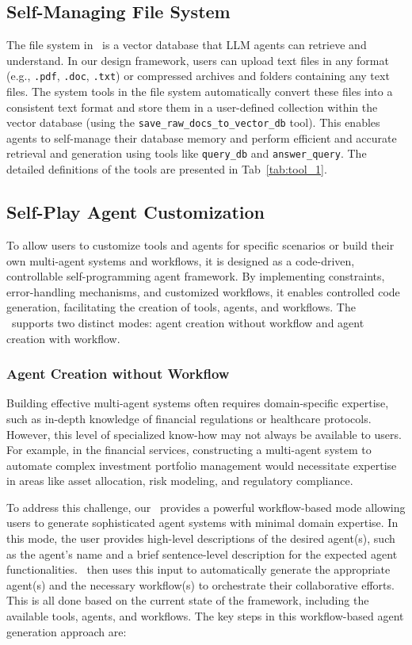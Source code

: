 \subsection{Self-Managing File System}
The file system in \model\ is a vector database that LLM agents can retrieve and understand. In our design framework, users can upload text files in any format (e.g., \texttt{.pdf}, \texttt{.doc}, \texttt{.txt}) or compressed archives and folders containing any text files. The system tools in the file system automatically convert these files into a consistent text format and store them in a user-defined collection within the vector database (using the \texttt{save\_raw\_docs\_to\_vector\_db} tool). This enables agents to self-manage their database memory and perform efficient and accurate retrieval and generation using tools like \texttt{query\_db} and \texttt{answer\_query}. The detailed definitions of the tools are presented in Tab~\ref{tab:tool_1}.

\subsection{Self-Play Agent Customization}
To allow users to customize tools and agents for specific scenarios or build their own multi-agent systems and workflows, it is designed as a code-driven, controllable self-programming agent framework. By implementing constraints, error-handling mechanisms, and customized workflows, it enables controlled code generation, facilitating the creation of tools, agents, and workflows. The \model\ supports two distinct modes: agent creation without workflow and agent creation with workflow.

\subsubsection{Agent Creation without Workflow}
Building effective multi-agent systems often requires domain-specific expertise, such as in-depth knowledge of financial regulations or healthcare protocols. However, this level of specialized know-how may not always be available to users. For example, in the financial services, constructing a multi-agent system to automate complex investment portfolio management would necessitate expertise in areas like asset allocation, risk modeling, and regulatory compliance.

To address this challenge, our \model\ provides a powerful workflow-based mode allowing users to generate sophisticated agent systems with minimal domain expertise. In this mode, the user provides high-level descriptions of the desired agent(s), such as the agent's name and a brief sentence-level description for the expected agent functionalities. \model\ then uses this input to automatically generate the appropriate agent(s) and the necessary workflow(s) to orchestrate their collaborative efforts. This is all done based on the current state of the framework, including the available tools, agents, and workflows. The key steps in this workflow-based agent generation approach are:

